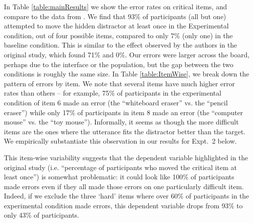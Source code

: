 \documentclass[manuscript]{stjour}
\begin{document}
In Table \ref{table:mainResults} we show the error rates on critical items, and compare to the data from
\cite{KeysarLinBarr03_LimitsOnTheoryOfMindUse}.
We find that 93\% of participants (all but one) attempted to move the hidden distractor at least once in the Experimental condition, out of four possible items, compared to only 7\% (only one) in the baseline condition. This is similar to the effect observed by the authors in the original study, which found 71\% and 0\%. Our errors were larger across the board, perhaps due to the interface or the population, but the gap between the two conditions is roughly the same size.
In Table \ref{table:ItemWise}, we break down the pattern of errors by item. 
We note that several items have much higher error rates than others -- for example, 75\% of participants in the experimental condition of item 6 made an error (the ``whiteboard eraser'' vs. the ``pencil eraser'') while only 17\% of participants in item 8 made an error (the ``computer mouse'' vs. the ``toy mouse''). Informally, it seems as though the more difficult items are the ones where the utterance fits the distractor better than the target. We empirically substantiate this observation in our results for Expt.~2 below.

This item-wise variability suggests that the dependent variable highlighted in the original study (i.e. ``percentage of participants who moved the critical item at least once'') is somewhat problematic: it could look like 100\% of participants made errors even if they all made those errors on one particularly difficult item. Indeed, if we exclude the three `hard' items where over 60\% of participants in the experimental condition made errors, this dependent variable drops from 93\% to only 43\% of participants. 
\end{document}
